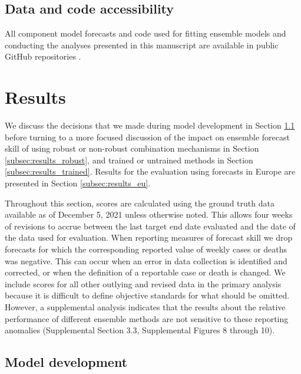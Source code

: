 \documentclass[11pt,3p,review,authoryear]{elsarticle}
\begin{document}
\subsection{Data and code accessibility}

All component model forecasts and code used for fitting ensemble models and conducting the analyses presented in this manuscript are available in public GitHub repositories \citep{cramer_reichlabcovid19-forecast-hub_2021, ray_reichlabcovidensembles_2020, ray_covid-19_ensemble_manuscript_2021}.

\section{Results}

We discuss the decisions that we made during model development in Section \ref{subsec:results_development} before turning to a more focused discussion of the impact on ensemble forecast skill of using robust or non-robust combination mechanisms in Section \ref{subsec:results_robust}, and trained or untrained methods in Section \ref{subsec:results_trained}. Results for the evaluation using forecasts in Europe are presented in Section \ref{subsec:results_eu}.

Throughout this section, scores are calculated using the ground truth data available as of December 5, 2021 unless otherwise noted. This allows four weeks of revisions to accrue between the last target end date evaluated and the date of the data used for evaluation. When reporting measures of forecast skill we drop forecasts for which the corresponding reported value of weekly cases or deaths was negative. This can occur when an error in data collection is identified and corrected, or when the definition of a reportable case or death is changed. We include scores for all other outlying and revised data in the primary analysis because it is difficult to define objective standards for what should be omitted. However, a supplemental analysis indicates that the results about the relative performance of different ensemble methods are not sensitive to these reporting anomalies (Supplemental Section 3.3, Supplemental Figures 8 through 10).

\subsection{Model development}
\label{subsec:results_development}
\end{document}
